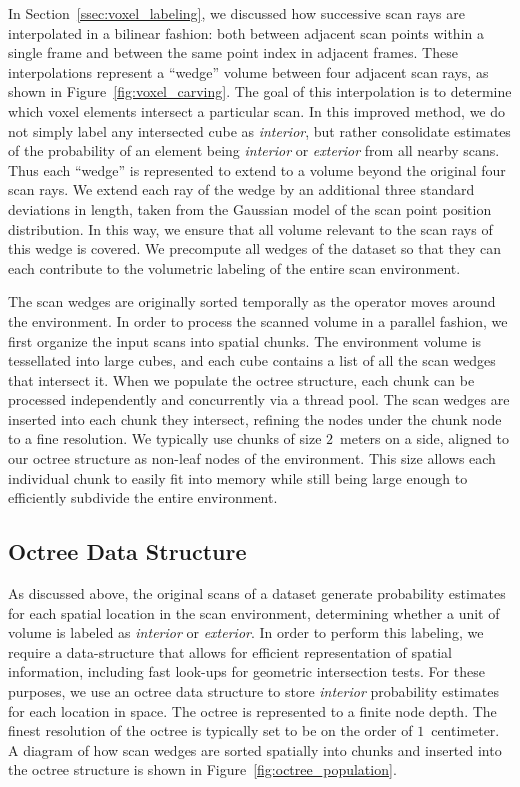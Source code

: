 \documentclass[12pt,onecolumn,oneside]{book}
\begin{document}
In Section~\ref{ssec:voxel_labeling}, we discussed how successive scan rays are interpolated in a bilinear fashion:  both between adjacent scan points within a single frame and between the same point index in adjacent frames.  These interpolations represent a ``wedge'' volume between four adjacent scan rays, as shown in Figure~\ref{fig:voxel_carving}.  The goal of this interpolation is to determine which voxel elements intersect a particular scan.  In this improved method, we do not simply label any intersected cube as {\it interior}, but rather consolidate estimates of the probability of an element being {\it interior} or {\it exterior} from all nearby scans.  Thus each ``wedge'' is represented to extend to a volume beyond the original four scan rays.  We extend each ray of the wedge by an additional three standard deviations in length, taken from the Gaussian model of the scan point position distribution.  In this way, we ensure that all volume relevant to the scan rays of this wedge is covered.  We precompute all wedges of the dataset so that they can each contribute to the volumetric labeling of the entire scan environment.

The scan wedges are originally sorted temporally as the operator moves around the environment.  In order to process the scanned volume in a parallel fashion, we first organize the input scans into spatial chunks.  The environment volume is tessellated into large cubes, and each cube contains a list of all the scan wedges that intersect it.  When we populate the octree structure, each chunk can be processed independently and concurrently via a thread pool.  The scan wedges are inserted into each chunk they intersect, refining the nodes under the chunk node to a fine resolution.  We typically use chunks of size $2$~meters on a side, aligned to our octree structure as non-leaf nodes of the environment.  This size allows each individual chunk to easily fit into memory while still being large enough to efficiently subdivide the entire environment.

\subsection{Octree Data Structure}
\label{ssec:procarve_octree}

As discussed above, the original scans of a dataset generate probability estimates for each spatial location in the scan environment, determining whether a unit of volume is labeled as {\it interior} or {\it exterior}.  In order to perform this labeling, we require a data-structure that allows for efficient representation of spatial information, including fast look-ups for geometric intersection tests.  For these purposes, we use an octree data structure to store {\it interior} probability estimates for each location in space.  The octree is represented to a finite node depth.  The finest resolution of the octree is typically set to be on the order of $1$~centimeter.  A diagram of how scan wedges are sorted spatially into chunks and inserted into the octree structure is shown in Figure~\ref{fig:octree_population}.  
\end{document}
